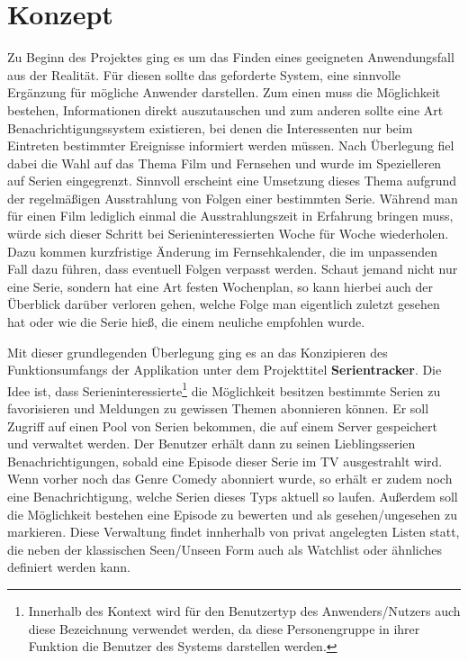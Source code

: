
\chapter{Konzept}

Zu Beginn des Projektes ging es um das Finden eines geeigneten Anwendungsfall aus der Realität. Für diesen sollte das geforderte System, eine sinnvolle Ergänzung für mögliche Anwender darstellen.
Zum einen muss die Möglichkeit bestehen, Informationen direkt auszutauschen und zum anderen sollte eine Art Benachrichtigungssystem existieren, bei denen die Interessenten nur beim Eintreten bestimmter Ereignisse informiert werden müssen.
Nach Überlegung fiel dabei die Wahl auf das Thema Film und Fernsehen und wurde im Spezielleren auf Serien eingegrenzt. Sinnvoll erscheint eine Umsetzung dieses Thema aufgrund der regelmäßigen Ausstrahlung von Folgen einer bestimmten Serie.
Während man für einen Film lediglich einmal die Ausstrahlungszeit in Erfahrung bringen muss, würde sich dieser Schritt bei Serieninteressierten Woche für Woche wiederholen. Dazu kommen kurzfristige Änderung im Fernsehkalender, die im unpassenden Fall dazu führen, dass eventuell Folgen verpasst werden. Schaut jemand nicht nur eine Serie, sondern hat eine Art festen Wochenplan, so kann hierbei auch der Überblick darüber verloren gehen, welche Folge man eigentlich zuletzt gesehen hat oder wie die Serie hieß, die einem neuliche empfohlen wurde.

\parskip 12pt
\parindent 0pt
Mit dieser grundlegenden Überlegung ging es an das Konzipieren des Funktionsumfangs der Applikation unter dem Projekttitel \textbf{Serientracker}.
Die Idee ist, dass Serieninteressierte\footnote[1]{Innerhalb des Kontext wird für den Benutzertyp des Anwenders/Nutzers auch diese Bezeichnung verwendet werden, da diese Personengruppe in ihrer Funktion die Benutzer des Systems darstellen werden.} die Möglichkeit besitzen bestimmte Serien zu favorisieren und Meldungen zu gewissen Themen abonnieren können. Er soll Zugriff auf einen Pool von Serien bekommen, die auf einem Server gespeichert und verwaltet werden. Der Benutzer erhält dann zu seinen Lieblingsserien Benachrichtigungen, sobald eine Episode dieser Serie im TV ausgestrahlt wird. Wenn vorher noch das Genre Comedy abonniert wurde, so erhält er zudem noch eine Benachrichtigung, welche Serien dieses Typs aktuell so laufen.
Außerdem soll die Möglichkeit bestehen eine Episode zu bewerten und als gesehen/ungesehen zu markieren. Diese Verwaltung findet innherhalb von privat angelegten Listen statt, die neben der klassischen Seen/Unseen Form auch als Watchlist oder ähnliches definiert werden kann.

